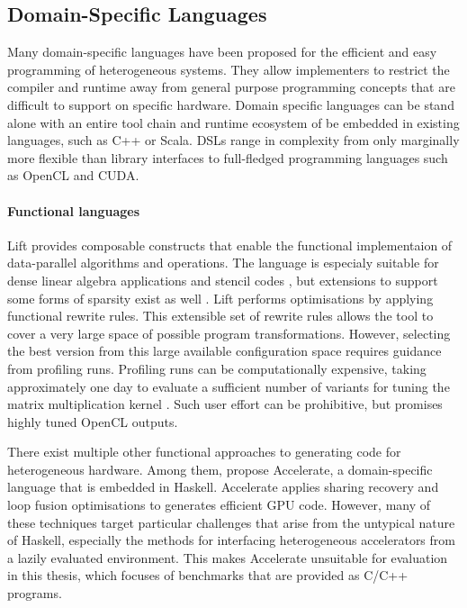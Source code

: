 \subsection{Domain-Specific Languages}

    Many domain-specific languages have been proposed for the efficient and
    easy programming of heterogeneous systems.
    They allow implementers to restrict the compiler and runtime away from
    general purpose programming concepts that are difficult to support on
    specific hardware.
    Domain specific languages can be stand alone with an entire tool chain and
    runtime ecosystem of be embedded in existing languages, such as C++ or
    Scala.
    DSLs range in complexity from only marginally more flexible than library
    interfaces to full-fledged programming languages such as OpenCL and CUDA.

    \paragraph*{Functional languages}
    Lift \citep{steuwer15rewrite} provides composable constructs that enable the
    functional implementaion of data-parallel algorithms and operations.
    The language is especialy suitable for dense linear algebra applications
    \citep{Steuwer:2016:MMB:2968455.2968521} and stencil codes
    \citep{Hagedorn:2018:HPS:3179541.3168824}, but extensions to support
    some forms of sparsity exist as well
    \citep{Pizzuti:2019:PAA:3331553.3342614}.
    Lift performs optimisations by applying functional rewrite rules.
    This extensible set of rewrite rules allows the tool to cover a very large
    space of possible program transformations.
    However, selecting the best version from this large available configuration
    space requires guidance from profiling runs.
    Profiling runs can be computationally expensive, taking approximately
    one day to evaluate a sufficient number of variants for tuning the matrix
    multiplication kernel \citep{Steuwer:2016:MMB:2968455.2968521}.
    Such user effort can be prohibitive, but promises highly tuned OpenCL
    outputs.

    There exist multiple other functional approaches to generating code for
    heterogeneous hardware.
    Among them, \citet{chakravarty11accelerating,mcdonell13optimising} propose
    Accelerate, a domain-specific language that is embedded in Haskell.
    Accelerate applies sharing recovery and loop fusion optimisations to
    generates efficient GPU code.
    However, many of these techniques target particular challenges that arise
    from the untypical nature of Haskell, especially the methods for interfacing
    heterogeneous accelerators from a lazily evaluated environment.
    This makes Accelerate unsuitable for evaluation in this thesis, which
    focuses of benchmarks that are provided as C/C++ programs.


